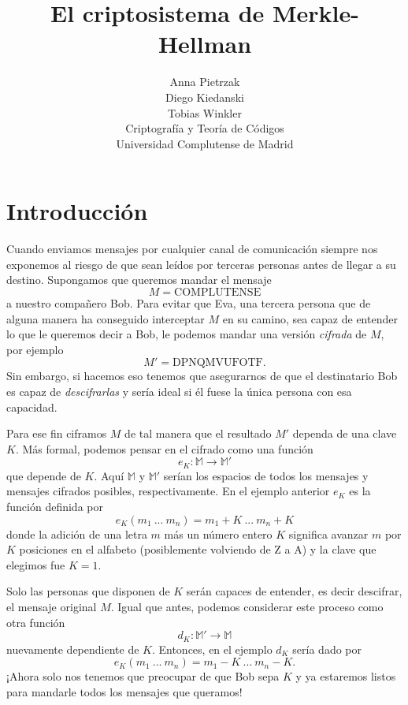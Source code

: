 \documentclass[12pt]{article}
\begin{document}
 
 
\title{El criptosistema de Merkle-Hellman}
\author{Anna Pietrzak\\Diego Kiedanski\\Tobias Winkler\\Criptografía y Teoría de Códigos\\Universidad Complutense de Madrid} %
 
\maketitle

\section{Introducción}



Cuando enviamos mensajes por cualquier canal de comunicación siempre nos exponemos al riesgo de que sean leídos por terceras personas antes de llegar a su destino. Supongamos que queremos mandar el mensaje
$$M = \text{COMPLUTENSE}$$
a nuestro compañero Bob. Para evitar que Eva, una tercera persona que de alguna manera ha conseguido interceptar $M$ en su camino, sea capaz de entender lo que le queremos decir a Bob, le podemos mandar una versión \emph{cifrada} de $M$, por ejemplo
$$M' = \text{DPNQMVUFOTF}.$$
Sin embargo, si hacemos eso tenemos que asegurarnos de que el destinatario Bob es capaz de \emph{descifrarlas} y sería ideal si él fuese la única persona con esa capacidad.

Para ese fin ciframos $M$ de tal manera que el resultado $M'$ dependa de una clave $K$. Más formal, podemos pensar en el cifrado como una función
$$e_K : \mathbb{M} \rightarrow \mathbb{M}'$$
que depende de $K$. Aquí $\mathbb{M}$ y $\mathbb{M}'$ serían los espacios de todos los mensajes y mensajes cifrados posibles, respectivamente. En el ejemplo anterior $e_K$ es la función definida por
$$e_K(m_1\ ...\ m_n) = m_1 + K\ ...\ m_n+K$$
donde la adición de una letra $m$ más un número entero $K$ significa avanzar $m$ por $K$ posiciones en el alfabeto (posiblemente volviendo de Z a A) y la clave que elegimos fue $K = 1$.

Solo las personas que disponen de $K$ serán capaces de entender, es decir descifrar, el mensaje original $M$. Igual que antes, podemos considerar este proceso como otra función
$$d_K : \mathbb{M}' \rightarrow \mathbb{M}$$
nuevamente dependiente de $K$. Entonces, en el ejemplo $d_K$ sería dado por
$$e_K(m_1\ ...\ m_n) = m_1 - K\ ...\ m_n - K.$$
¡Ahora solo nos tenemos que preocupar de que Bob sepa $K$ y ya estaremos listos para mandarle todos los mensajes que queramos!
\end{document}
